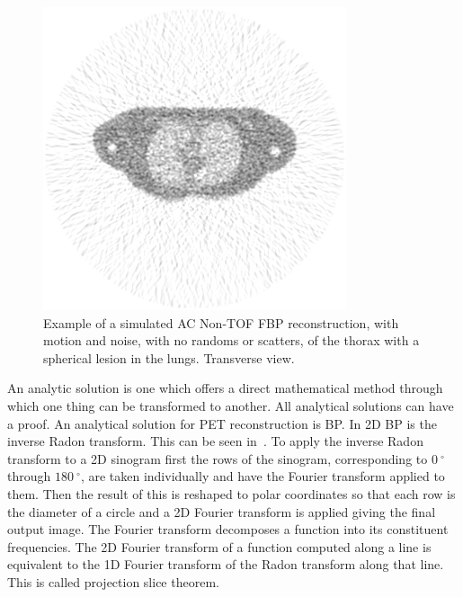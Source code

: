             \begin{figure}
                \centering
                
                \includegraphics[width=1.0\linewidth]{figures/background_fbp_example.png}
                
                \captionsetup{singlelinecheck=false}
                \caption{
                    Example of a simulated \gls{AC} \gls{Non-TOF} \gls{FBP} reconstruction, with motion and noise, with no randoms or scatters, of the thorax with a spherical lesion in the lungs. Transverse view.
                }
                \label{fig:analytic_image_reconstruction_fbp_example}
            \end{figure}
            
            An analytic solution is one which offers a direct mathematical method through which one thing can be transformed to another. All analytical solutions can have a proof. An analytical solution for \gls{PET} reconstruction is \gls{BP}. In \gls{2D} \gls{BP} is the inverse Radon transform. This can be seen in~. To apply the inverse Radon transform to a \gls{2D} sinogram first the rows of the sinogram, corresponding to $\SI{0}{^{\circ}}$ through $\SI{180}{^{\circ}}$, are taken individually and have the Fourier transform applied to them. Then the result of this is reshaped to polar coordinates so that each row is the diameter of a circle and a \gls{2D} Fourier transform is applied giving the final output image. The Fourier transform decomposes a function into its constituent frequencies. The \gls{2D} Fourier transform of a function computed along a line is equivalent to the \gls{1D} Fourier transform of the Radon transform along that line. This is called projection slice theorem. 
            
